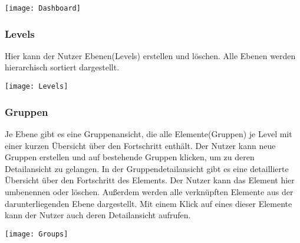 \vspace{20pt}
\begin{center}
    \begin{minipage}{\linewidth}
        \texttt{[image: Dashboard]}
    \end{minipage}
\end{center}
\vspace{20pt}

\subsubsection{Levels}
Hier kann der Nutzer Ebenen(Levels) erstellen und löschen. Alle Ebenen werden hierarchisch sortiert dargestellt.

\vspace{20pt}
\begin{center}
    \begin{minipage}{\linewidth}
        \texttt{[image: Levels]}
    \end{minipage}
\end{center}
\vspace{20pt}

\subsubsection{Gruppen}
Je Ebene gibt es eine Gruppenansicht, die alle Elemente(Gruppen) je Level mit einer kurzen Übersicht über den Fortschritt enthält. Der Nutzer kann neue Gruppen erstellen und auf bestehende Gruppen klicken, um zu deren Detailansicht zu gelangen.
In der Gruppendetailansicht gibt es eine detaillierte Übersicht über den Fortschritt des Elements. Der Nutzer kann das Element hier umbenennen oder löschen. Außerdem werden alle verknüpften Elemente aus der darunterliegenden Ebene dargestellt. Mit einem Klick auf eines dieser Elemente kann der Nutzer auch deren Detailansicht aufrufen.

\vspace{20pt}
\begin{center}
    \begin{minipage}{\linewidth}
        \texttt{[image: Groups]}
    \end{minipage}
\end{center}
\vspace{20pt}

